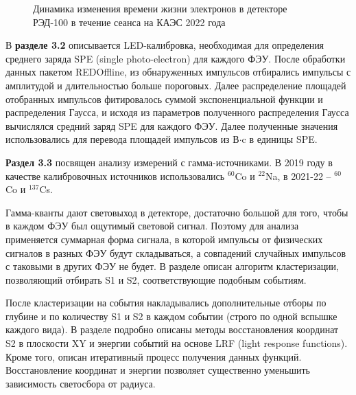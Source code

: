 \begin{figure}[ht!]	
	\caption{Динамика изменения времени жизни электронов в детекторе РЭД-100 в течение сеанса на КАЭС 2022 года}
	\label{img:lt2022}
\end{figure}

В \textbf{разделе 3.2} описывается LED-калибровка, необходимая для определения среднего заряда SPE (single photo-electron) для каждого ФЭУ. После обработки данных пакетом REDOffline, из обнаруженных импульсов отбирались импульсы с амплитудой и длительностью больше пороговых. Далее распределение площадей отобранных импульсов фитировалось суммой экспоненциальной функции и распределения Гаусса, и исходя из параметров полученного распределения Гаусса вычислялся средний заряд SPE для каждого ФЭУ. Далее полученные значения использовались для перевода площадей импульсов из В$\cdot$c в единицы SPE.

\textbf{Раздел 3.3} посвящен анализу измерений с гамма-источниками. В 2019 году в качестве калибровочных источников использовались $^{60}$Co и $^{22}$Na, в 2021-22 -- $^{60}$Co и $^{137}$Cs. 

Гамма-кванты дают световыход в детекторе, достаточно большой для того, чтобы в каждом ФЭУ был ощутимый световой сигнал. Поэтому для анализа применяется суммарная форма сигнала, в которой импульсы от физических сигналов в разных ФЭУ будут складываться, а совпадений случайных импульсов с таковыми в других ФЭУ не будет. В разделе описан алгоритм кластеризации, позволяющий отбирать S1 и S2, соответствующие подобным событиям.

После кластеризации на события накладывались дополнительные отборы по глубине и по количеству S1 и S2 в каждом событии (строго по одной вспышке каждого вида). В разделе подробно описаны методы восстановления координат S2 в плоскости XY и энергии событий на основе LRF (light response functions). Кроме того, описан итеративный процесс получения данных функций. Восстановление координат и энергии позволяет существенно уменьшить зависимость светосбора от радиуса. 

